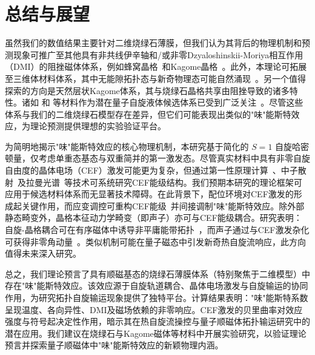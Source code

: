 \chapter{总结与展望}
\label{chap:summary}
    虽然我们的数值结果主要针对二维烧绿石薄膜，但我们认为其背后的物理机制和预测现象可推广至其他具有非共线伊辛轴和/或非零Dzyaloshinskii-Moriya相互作用（DMI）的阻挫磁体体系，例如蜂窝晶格~\cite{ganesh2011quantum,joshi2019Mathbb,liu2020featureless}和Kagome晶格~\cite{ma2024upper}。此外，本理论可拓展至三维体材料体系，其中无能隙拓扑态与新奇物理态可能自然涌现~\cite{li2018competing,li2016weyl,hwang2020topological}。另一个值得探索的方向是天然层状Kagome体系，其与烧绿石晶格共享由阻挫导致的诸多特性。诸如  和  等材料作为潜在量子自旋液体候选体系已受到广泛关注~\cite{norman2016ColloquiumHerbertsmithite}。尽管这些体系与我们的二维烧绿石模型存在差异，但它们可能表现出类似的"味"能斯特效应，为理论预测提供理想的实验验证平台。

    为简明地揭示"味"能斯特效应的核心物理机制，本研究基于简化的 $S=1$ 自旋哈密顿量，仅考虑单重态基态与双重简并的第一激发态。尽管真实材料中具有非零自旋自由度的晶体电场（CEF）激发可能更为复杂，但通过第一性原理计算~\cite{brooks1997density}、中子散射~\cite{frick1986crystal,zhang2014neutron}及拉曼光谱~\cite{schaack2007raman}等技术可系统研究CEF能级结构。我们预期本研究的理论框架可应用于候选材料体系而无显著技术障碍。在此背景下，配位环境对CEF激发的形成起关键作用，而应变调控可重构CEF能级~\cite{jensen1991rare,ishikawa2017reversed,pinho2021impact}并间接调制"味"能斯特效应。除外部静态畸变外，晶格本征动力学畸变（即声子）亦可与CEF能级耦合。研究表明：自旋-晶格耦合可在有序磁体中诱导非平庸能带拓扑~\cite{go2019topological,park2019topological,ma2022antiferromagnetic,ma2024Chiral}，而声子通过与CEF激发杂化可获得非零角动量~\cite{lujan2024spin,chaudhary2024Giant}。类似机制可能在量子磁态中引发新奇热自旋流响应，此方向值得未来深入研究。
    
    总之，我们理论预言了具有顺磁基态的烧绿石薄膜体系（特别聚焦于二维模型）中存在"味"能斯特效应。该效应源于自旋轨道耦合、晶体电场激发与自旋输运的协同作用，为研究拓扑自旋输运现象提供了独特平台。计算结果表明："味"能斯特系数呈现温度、各向异性、DMI及磁场依赖的非零响应。CEF激发的贝里曲率对效应强度与符号起决定性作用，暗示其在热自旋流操控与量子顺磁体拓扑输运研究中的潜在应用。我们建议在烧绿石与Kagome磁体等材料中开展实验研究，以验证理论预言并探索量子顺磁体中"味"能斯特效应的新颖物理内涵。